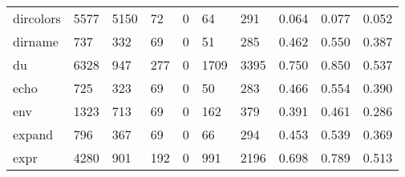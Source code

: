 \begin{longtable}{lp{2.0cm}p{2.0cm}p{2.0cm}p{2.0cm}p{2.0cm}p{2.0cm}p{2.0cm}p{2.0cm}p{2.0cm}}
dircolors &                   5577 &                               5150 &                                72 &                                0 &                                64 &                             291 &                                0.064 &                                  0.077 &                                0.052 \\
dirname   &                    737 &                                332 &                                69 &                                0 &                                51 &                             285 &                                0.462 &                                  0.550 &                                0.387 \\
du        &                   6328 &                                947 &                               277 &                                0 &                              1709 &                            3395 &                                0.750 &                                  0.850 &                                0.537 \\
echo      &                    725 &                                323 &                                69 &                                0 &                                50 &                             283 &                                0.466 &                                  0.554 &                                0.390 \\
env       &                   1323 &                                713 &                                69 &                                0 &                               162 &                             379 &                                0.391 &                                  0.461 &                                0.286 \\
expand    &                    796 &                                367 &                                69 &                                0 &                                66 &                             294 &                                0.453 &                                  0.539 &                                0.369 \\
expr      &                   4280 &                                901 &                               192 &                                0 &                               991 &                            2196 &                                0.698 &                                  0.789 &                                0.513 \\

\end{longtable}
